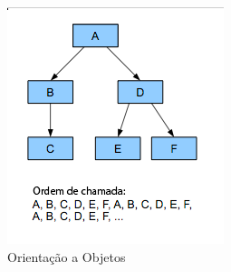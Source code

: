 \begin{figure}[h!]
    \centering
    \begin{subfigure}[b]{0.35\textwidth}
        \includegraphics[width=\textwidth]{../figuras/objectreadingorder}
        \caption{Orientação a Objetos}
        \label{fig:ood}
    \end{subfigure}
    \begin{subfigure}[b]{0.35\textwidth}

\end{subfigure}
\end{figure}
